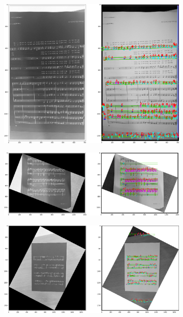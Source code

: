\documentclass[12pt]{article}
\begin{document}
\begin{enumerate}
\begin{figure}[h!]
\begin{subfigure}[b]{0.48\linewidth}
				\end{subfigure}
				\begin{subfigure}[b]{0.48\linewidth}
					\includegraphics[width=\linewidth]{Medium/Zdj3.png}
				\end{subfigure}
				\begin{subfigure}[b]{0.48\linewidth}
					\includegraphics[width=\linewidth]{Medium/Zdj4.png}
				\end{subfigure}
				\begin{subfigure}[b]{0.48\linewidth}
					\includegraphics[width=\linewidth]{Medium/Zdj5.png}

\end{subfigure}
\end{figure}
\end{enumerate}
\end{document}
